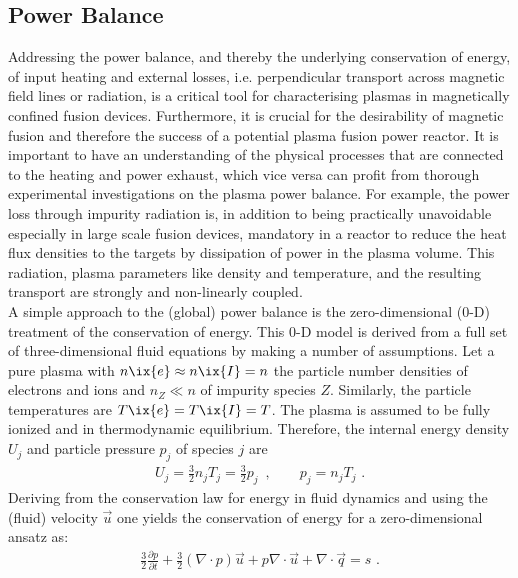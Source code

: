         \subsection{Power Balance}\label{subsec:power_balance}%
%
            Addressing the power balance, and thereby the underlying conservation of energy, of input heating and external losses, i.e. perpendicular transport across magnetic field lines or radiation, is a critical tool for characterising plasmas in magnetically confined fusion devices. Furthermore, it is crucial for the desirability of magnetic fusion and therefore the success of a potential plasma fusion power reactor\cite{Freidberg2007}. It is important to have an understanding of the physical processes that are connected to the heating and power exhaust, which vice versa can profit from thorough experimental investigations on the plasma power balance. For example, the power loss through impurity radiation is, in addition to being practically unavoidable especially in large scale fusion devices, mandatory in a reactor to reduce the heat flux densities to the targets by dissipation of power in the plasma volume. This radiation, plasma parameters like density and temperature, and the resulting transport are strongly and non-linearly coupled\cite{Hirsch2008}.\\%
            A simple approach to the (global) power balance is the zero-dimensional (0-D) treatment of the conservation of energy. This 0-D model is derived from a full set of three-dimensional fluid equations by making a number of assumptions. Let a pure plasma with $n\ix{e}\approx n\ix{I}=n$ the particle number densities of electrons and ions and $n_{Z}\ll n$ of impurity species $Z$. Similarly, the particle temperatures are $T\ix{e}=T\ix{I}=T$. The plasma is assumed to be fully ionized and in thermodynamic equilibrium. Therefore, the internal energy density $U_{j}$ and particle pressure $p_{j}$ of species $j$ are%
%
            \begin{align}%
                U_{j}=\frac{3}{2}n_{j}T_{j}=\frac{3}{2}p_{j}\,\,\,,\qquad%
                p_{j}=n_{j}T_{j}\,\,.\nonumber%
            \end{align}%
%
            Deriving from the conservation law for energy in fluid dynamics and using the (fluid) velocity $\vec{u}$ one yields the conservation of energy for a zero-dimensional ansatz as\cite{Freidberg2007}:%
%
            \begin{align}%
                \frac{3}{2}\frac{\partial p}{\partial t}+\frac{3}{2}\left(\nabla\cdot p\right)\vec{u}+p\nabla\cdot\vec{u}+\nabla\cdot\vec{q}=s\label{eq:0d_conserve}\,\,.%
            \end{align}%
